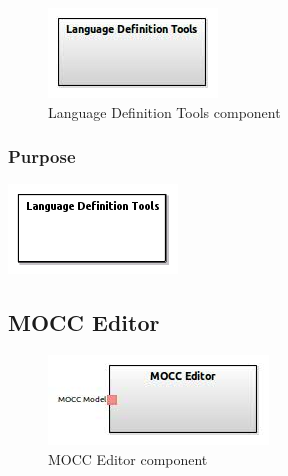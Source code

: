 \documentclass{gemoc} %
\begin{document}
\begin{figure}[htp]
	\begin{center}
	\includegraphics*[trim=0.0cm 0.0cm 0cm 0.0cm, clip=true, scale=1.0]{../images/generated/Generated_Language Definition Tools.jpg}
	\caption{Language Definition Tools component}
	\end{center}
\end{figure}

\subsubsection{Purpose}

\begin{center}
\includegraphics*[trim=0.0cm 0.0cm 0cm 0.0cm, clip=true]{../images/generated/Generated_Language_Definition_Tools.png}
\end{center}



\subsection{MOCC Editor}

\begin{figure}[htp]
	\begin{center}
	\includegraphics*[trim=0.0cm 0.0cm 0cm 0.0cm, clip=true, scale=1.0]{../images/generated/Generated_MOCC Editor.jpg}
	\caption{MOCC Editor component}
	\end{center}
\end{figure}
\end{document}
